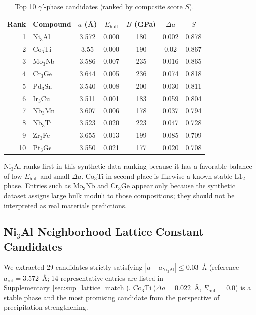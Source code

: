 \documentclass{npj-compt.mater}
\begin{document}
\begin{table}[t]
  \centering
  \caption{Top 10 $\gamma'$-phase candidates (ranked by composite score $S$).}
  \label{tab:gamma_prime}
  \small
  \begin{tabular}{rlccccc}
    \toprule
    Rank & Compound & $a$ (\AA) & $E_\text{hull}$ & $B$ (GPa) & $\Delta a$ & $S$ \\
    \midrule
    1 & Ni$_3$Al & 3.572 & 0.000 & 180 & 0.002 & 0.878 \\
    2 & Co$_3$Ti & 3.55 & 0.000 & 190 & 0.02 & 0.867 \\
    3 & Mo$_3$Nb & 3.586 & 0.007 & 235 & 0.016 & 0.865 \\
    4 & Cr$_3$Ge & 3.644 & 0.005 & 236 & 0.074 & 0.818 \\
    5 & Pd$_3$Sn & 3.540 & 0.008 & 200 & 0.030 & 0.811 \\
    6 & Ir$_3$Cu & 3.511 & 0.001 & 183 & 0.059 & 0.804 \\
    7 & Nb$_3$Mn & 3.607 & 0.006 & 178 & 0.037 & 0.794 \\
    8 & Nb$_3$Ti & 3.523 & 0.020 & 223 & 0.047 & 0.728 \\
    9 & Zr$_3$Fe & 3.655 & 0.013 & 199 & 0.085 & 0.709 \\
    10 & Pt$_3$Ge & 3.550 & 0.021 & 177 & 0.020 & 0.708 \\
    \bottomrule
  \end{tabular}
\end{table}

Ni$_3$Al ranks first in this synthetic-data ranking because it
has a favorable balance of low $E_\text{hull}$ and small
$\Delta a$.  Co$_3$Ti in second place is likewise a known stable
L1$_2$ phase.  Entries such as Mo$_3$Nb and Cr$_3$Ge appear only
because the synthetic dataset assigns large bulk moduli to those
compositions; they should not be interpreted as real materials
predictions.

\subsection{Ni$_3$Al Neighborhood Lattice Constant Candidates}
\label{sec:ni3al_lattice}

We extracted 29 candidates strictly satisfying
$|a - a_{\text{Ni}_3\text{Al}}| \leq 0.03$~\AA
(reference $a_{\text{ref}} = 3.572$~\AA; 14 representative
entries are listed in Supplementary~\ref{sec:sup_lattice_match}).
Co$_3$Ti ($\Delta a = 0.022$~\AA, $E_\text{hull} = 0.0$) is a
stable phase and the most promising candidate from the
perspective of precipitation strengthening.
\end{document}
